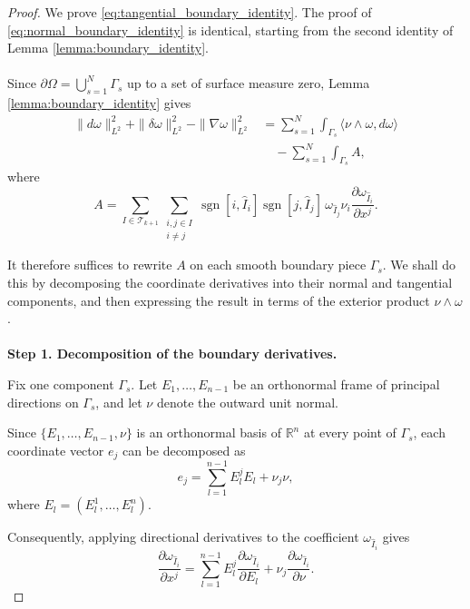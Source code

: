 \begin{proof}
We prove \eqref{eq:tangential_boundary_identity}. The proof of
\eqref{eq:normal_boundary_identity} is identical, starting from the
second identity of Lemma \ref{lemma:boundary_identity}.
\\\\ Since $\partial\Omega=\bigcup_{s=1}^N\Gamma_s$ up to a set of
surface measure zero, Lemma \ref{lemma:boundary_identity} gives
\begin{equation}
\label{eq:boundary_start}
\begin{aligned}
\|d\omega\|_{L^2}^2+\|\delta\omega\|_{L^2}^2-\|\nabla\omega\|_{L^2}^2
&=
\sum_{s=1}^N
\int_{\Gamma_s}
\langle \nu\wedge\omega,d\omega\rangle     \\
&\quad-
\sum_{s=1}^N
\int_{\Gamma_s}
A,
\end{aligned}
\end{equation}
where
\[
A=
\sum_{I\in\mathscr{T}_{k+1}}
\sum_{\substack{i,j\in I\\ i\neq j}}
\operatorname{sgn}[i,\widehat I_i]
\operatorname{sgn}[j,\widehat I_j]
\,
\omega_{\widehat I_j}
\nu_i
\frac{\partial\omega_{\widehat I_i}}{\partial x^j}.
\]

It therefore suffices to rewrite $A$ on each smooth boundary piece
$\Gamma_s$. We shall do this by decomposing the coordinate derivatives
into their normal and tangential components, and then expressing the
result in terms of the exterior product $\nu\wedge\omega$.
\\\\ \textbf{Step 1. Decomposition of the boundary derivatives.}

Fix one component $\Gamma_s$. Let
$E_1,\ldots,E_{n-1}$ be an orthonormal frame of principal directions
on $\Gamma_s$, and let $\nu$ denote the outward unit normal.

Since $\{E_1,\ldots,E_{n-1},\nu\}$ is an orthonormal basis of
$\mathbb{R}^n$ at every point of $\Gamma_s$, each coordinate vector
$e_j$ can be decomposed as
\[
e_j=\sum_{l=1}^{n-1}E_l^jE_l+\nu_j\nu,
\]
where $E_l=(E_l^1,\ldots,E_l^n)$.

Consequently, applying directional derivatives to the coefficient
$\omega_{\widehat I_i}$ gives
\begin{equation}
\label{eq:directional_decomposition}
\frac{\partial\omega_{\widehat I_i}}{\partial x^j}
=
\sum_{l=1}^{n-1}
E_l^j
\frac{\partial\omega_{\widehat I_i}}{\partial E_l}
+
\nu_j
\frac{\partial\omega_{\widehat I_i}}{\partial\nu}.
\end{equation}


\end{proof}
